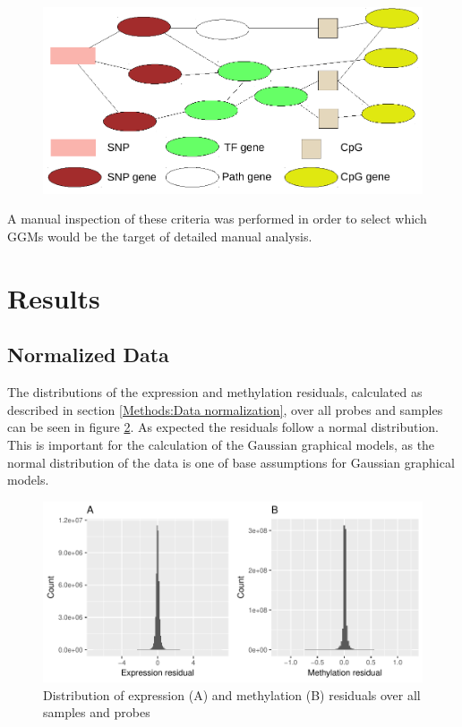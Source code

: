\documentclass[a4paper,12pt,twoside,openright]{article}
\let\oldsection\section
\def\section{\cleardoublepage\oldsection}
\begin{document}
\begin{figure}[b!]
	\includegraphics[scale=0.92, keepaspectratio = true]{../figures/ggm_expectation_scheme}
	\caption{}
	\label{fig:ggm.expectation.scheme}
\end{figure}


A manual inspection of these criteria was performed in order to select which GGMs would be the target of detailed manual analysis. 

\newpage
\section{Results}
\label{Results}
\subsection{Normalized Data}
\label{Results:Normalized Data}
The distributions of the expression and methylation residuals, calculated as described in section \ref{Methods:Data normalization}, over all probes and samples can be seen in figure \ref{fig:expr.meth.res.hist}. As expected the residuals follow a normal distribution. This is important for the calculation of the Gaussian graphical models, as the normal distribution of the data is one of base assumptions for Gaussian graphical models\cite{Mohammadi2015}.

\begin{figure}[b!]
	\includegraphics[scale=1, keepaspectratio = true]{../figures/expr_meth_res_hist}
	\caption{Distribution of expression (A) and methylation (B) residuals over all samples and probes}
	\label{fig:expr.meth.res.hist}
\end{figure}
\end{document}
